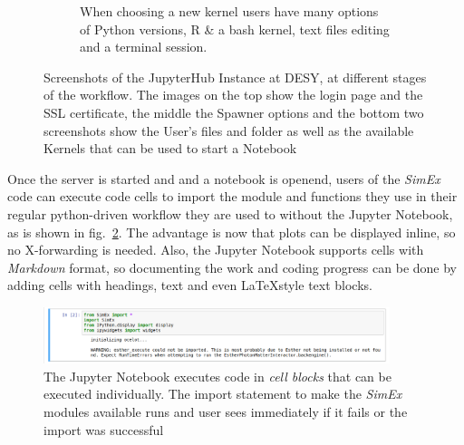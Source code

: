 \documentclass[10pt]{scrartcl}
\begin{document}
\begin{figure}
\begin{subfigure}{0.45\textwidth}
	  \caption{When choosing a new kernel users have many options of Python versions, R \& a bash kernel, text files editing and a terminal session.} %
  \end{subfigure}
  \caption{Screenshots of the JupyterHub Instance at DESY, at different stages of the workflow. The images on the top show the login page and the SSL certificate, the middle the Spawner options and the bottom two screenshots show the User's files and folder as well as the available Kernels that can be used to start a Notebook}
  \label{fig:jhub_work}
\end{figure}

Once the server is started and and a notebook is openend, users of the \textit{SimEx} code can execute code cells
to import the module and functions they use in their regular python-driven workflow they are used to without the Jupyter Notebook, as is shown in fig.~\ref{fig:simex_import}.
The advantage is now that plots can be displayed inline, so no X-forwarding is needed.
Also, the Jupyter Notebook supports cells with \textit{Markdown} format, so documenting the work and coding progress
can be done by adding cells with headings, text and even \LaTeX style text blocks.


\begin{figure}
 \centering
 \includegraphics[width=0.9\textwidth]{figures/simex_import_jhub.png}
 \caption{The Jupyter Notebook executes code in \textit{cell blocks} that can be executed individually. The import statement to make the \textit{SimEx} modules available runs and user sees immediately if it fails or the import was successful}
 \label{fig:simex_import}
\end{figure}

\printbibliography[title={References}]
%
%
%
%

\end{document}
